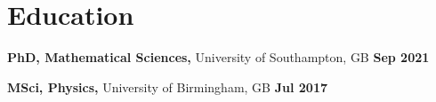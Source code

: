 \section{Education}

\textbf{PhD, Mathematical Sciences,} University of Southampton, GB
\hfill \textbf{Sep 2021}

\textbf{MSci, Physics,} University of Birmingham, GB
\hfill \textbf{Jul 2017}%
